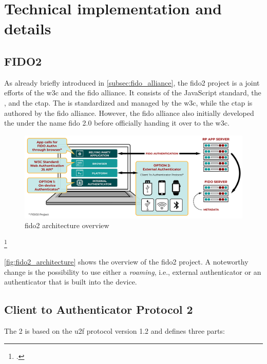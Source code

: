 \section{Technical implementation and details}

\subsection{FIDO2}

As already briefly introduced in \autoref{subsec:fido_alliance}, the \gls{fido}2 project is a joint efforts of the \gls{w3c} and the \gls{fido} alliance. It consists of the JavaScript standard, the \wa{}, and the \gls{ctap}. The \wa{} is standardized and managed by the \gls{w3c}, while the \gls{ctap} is authored by the \gls{fido} alliance. However, the \gls{fido} alliance also initially developed the \wa{} under the name \gls{fido} 2.0 before officially handing it over to the \gls{w3c}.

\begin{figure}[hbt]
	\centering
	\includegraphics[width=\textwidth]{pics/FIDO2-Graphic-v2}
	\caption[\gls{fido}2 architecture overview]{\gls{fido}2 architecture overview\footnotemark}
	\label{fig:fido2_architecture}
\end{figure}
\footcitetext[Source: https://fidoalliance.org/specifications/][4]{uaf-overview}

\autoref{fig:fido2_architecture} shows the overview of the \gls{fido}2 project. A noteworthy change is the possibility to use either a \textit{roaming}, i.e., external authenticator or an authenticator that is built into the device.

\subsection{Client to Authenticator Protocol 2}

The  2 is based on the \gls{u2f} protocol version 1.2 and defines three parts:

